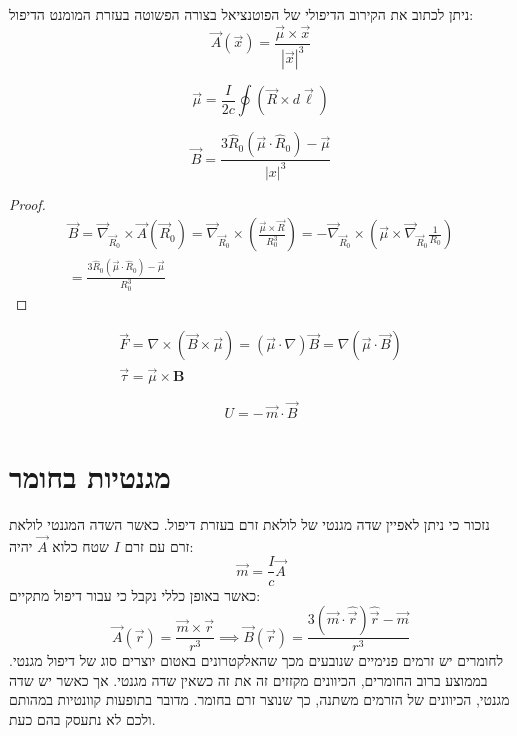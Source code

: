 \documentclass{tstextbook}
\begin{document}
\begin{corollary}
ניתן לכתוב את הקירוב הדיפולי של הפוטנציאל בצורה הפשוטה בעזרת המומנט הדיפול:
$$\vec{A}\left( \vec{x} \right)={\frac{\vec{\mu}\times\vec{x}}{|\vec{x}|^{3}}}$$

\end{corollary}
\begin{proposition}
$${\vec{\mu}}={\frac{I}{2c}}\oint\left({\vec{R}}\times d{\vec{\ell}}\right)$$

\end{proposition}
\begin{proposition}
$$\vec{B} =\frac{3\hat{R}_{0}\left(\vec{\mu}\cdot\hat{R}_{0}\right)-\vec{\mu}}{|x|^{3}}$$

\end{proposition}
\begin{proof}
\begin{gather*}\vec{B}=\vec{\nabla}_{\vec{R}_{0}}\times\vec{A}\left(\vec{R}_{0}\right)=\vec{\nabla}_{\vec{R}_{0}}\times\left(\frac{\vec{\mu}\times\vec{R}}{R_{0}^{3}}\right)=-\vec{\nabla}_{\vec{R}_{0}}\times\left(\vec{\mu}\times\vec{\nabla}_{\vec{R}_{0}}\frac{1}{R_{0}}\right)\\=\frac{3\hat{R}_{0}\left(\vec{\mu}\cdot\hat{R}_{0}\right)-\vec{\mu}}{R_{0}^{3}} 
\end{gather*}

\end{proof}
\begin{proposition}
\begin{gather*}\vec{F}=\nabla\times\left( \vec{B}\times\vec{\mu} \right)=\left( \vec{\mu}\cdot\nabla \right)\vec{B}=\nabla\left( \vec{\mu}\cdot\vec{B} \right)  \\{\vec{\tau}}={\vec{\mu}}\times{\textbf{B}}
\end{gather*}

\end{proposition}
\begin{proposition}
$$U=-\,\vec{m}\cdot\vec{B}$$

\end{proposition}
\section{מגנטיות בחומר}

נזכור כי ניתן לאפיין שדה מגנטי של לולאת זרם בעזרת דיפול. כאשר השדה המגנטי לולאת זרם עם זרם \(I\) שטח כלוא \(\vec{A}\) יהיה:
$$\vec{m} = \frac{I}{c}\vec{A}$$
כאשר באופן כללי נקבל כי עבור דיפול מתקיים:
$$\vec{A}\left( \vec{r} \right)={\frac{\vec{m}\times\vec{r}}{r^{3}}}\implies\vec{B}\left( \vec{r} \right)={\frac{3\left( \vec{m}\cdot{\hat{\vec{r}}} \right){\hat{\vec{r}}}-\vec{m}}{r^{3}}}$$
לחומרים יש זרמים פנימיים שנובעים מכך שהאלקטרונים באטום יוצרים סוג של דיפול מגנטי. בממוצע ברוב החומרים, הכיוונים מקזזים זה את זה כשאין שדה מגנטי. אך כאשר יש שדה מגנטי, הכיוונים של הזרמים משתנה, כך שנוצר זרם בחומר. מדובר בתופעות קוונטיות במהותם ולכם לא נתעסק בהם כעת.
\end{document}
